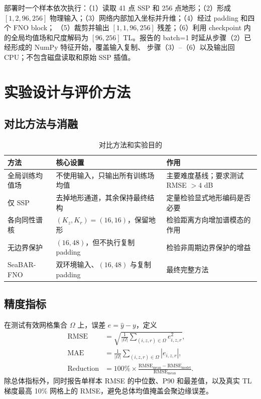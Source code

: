 \documentclass[UTF8,11pt]{ctexart}
\newcommand{\RMSE}{\mathrm{RMSE}}
\begin{document}
部署时一个样本依次执行：（1）读取 41 点 SSP 和 256 点地形；（2）形成
$[1,2,96,256]$ 物理输入；（3）网络内部加入坐标并升维；（4）经过 padding 和四个 FNO block；
（5）裁剪并输出 $[1,1,96,256]$ 残差；（6）利用 checkpoint 内的全局均值场和尺度解码为
$[96,256]$ TL。报告的 batch=1 时延从步骤（2）已经形成的 NumPy 特征开始，覆盖输入复制、
步骤（3）--（6）以及输出回 CPU；不包含磁盘读取和原始 SSP 插值。

\section{实验设计与评价方法}

\subsection{对比方法与消融}

\begin{table}[H]
\centering
\caption{对比方法和实验目的}
\begin{tabularx}{\textwidth}{L{3.3cm}L{3.6cm}Y}
\toprule
方法 & 核心设置 & 作用 \\
\midrule
全局训练均值场 & 不使用输入，只输出所有训练场均值 & 主要难度基线；要求测试 RMSE $>4$ dB \\
仅 SSP & 去掉地形通道，其余保持最终结构 & 定量检验显式地形编码是否必要 \\
各向同性谱核 & $(K_z,K_r)=(16,16)$，保留地形 & 检验距离方向增加谱模态的作用 \\
无边界保护 & $(16,48)$，但不执行复制 padding & 检验非周期边界保护的增益 \\
SeaBAR-FNO & 双环境输入、$(16,48)$ 与复制 padding & 最终完整方法 \\
\bottomrule
\end{tabularx}
\end{table}

\subsection{精度指标}

在测试有效网格集合 $\Omega$ 上，误差 $e=\hat y-y$，定义
\begin{align}
  \RMSE &= \sqrt{\frac{1}{|\Omega|}\sum_{(i,z,r)\in\Omega}e_{i,z,r}^2},\\
  \mathrm{MAE} &= \frac{1}{|\Omega|}\sum_{(i,z,r)\in\Omega}|e_{i,z,r}|,\\
  \mathrm{Reduction} &=100\%\times\frac{\RMSE_{\mathrm{mean}}-\RMSE_{\mathrm{model}}}
  {\RMSE_{\mathrm{mean}}}.
\end{align}
除总体指标外，同时报告单样本 RMSE 的中位数、P90 和最差值，以及真实 TL 梯度最高
10\% 网格上的 RMSE，避免总体均值掩盖会聚边缘误差。
\end{document}

